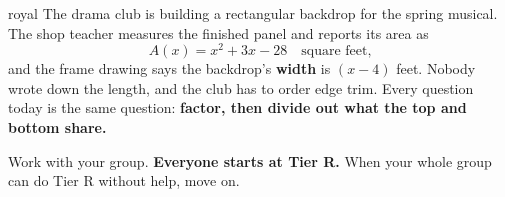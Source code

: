 \documentclass[10pt]{article}
\begin{document}

\vspace{0.15in}

\begin{scenariobox}{royal}
\small
The drama club is building a rectangular backdrop for the spring musical. The shop teacher measures
the finished panel and reports its area as
\[ A(x) = x^2+3x-28 \quad \text{square feet,} \]
and the frame drawing says the backdrop's \textbf{width} is $(x-4)$ feet. Nobody wrote down the
length, and the club has to order edge trim. Every question today is the same question:
\textbf{factor, then divide out what the top and bottom share.}

Work with your group. \textbf{Everyone starts at Tier R.} When your whole group can do Tier R
without help, move on.
\end{scenariobox}

\vspace{0.10in}
\end{document}
